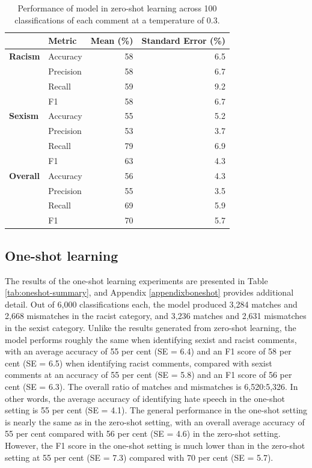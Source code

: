 \documentclass[12pt,]{article}
\begin{document}
\begin{table}

\caption{\label{tab:zeroshot-summary}Performance of model in zero-shot learning across 100 classifications of each comment at a temperature of 0.3.}
\centering
\begin{tabular}[t]{>{}llrr}
\toprule
 & Metric & Mean (\%) & Standard Error (\%)\\
\midrule
\textbf{Racism} & Accuracy & 58 & 6.5\\
\textbf{} & Precision & 58 & 6.7\\
\textbf{} & Recall & 59 & 9.2\\
\textbf{} & F1 & 58 & 6.7\\
\textbf{Sexism} & Accuracy & 55 & 5.2\\
\textbf{} & Precision & 53 & 3.7\\
\textbf{} & Recall & 79 & 6.9\\
\textbf{} & F1 & 63 & 4.3\\
\textbf{Overall} & Accuracy & 56 & 4.3\\
\textbf{} & Precision & 55 & 3.5\\
\textbf{} & Recall & 69 & 5.9\\
\textbf{} & F1 & 70 & 5.7\\
\bottomrule
\end{tabular}
\end{table}

\hypertarget{one-shot-learning-1}{%
\subsection{One-shot learning}\label{one-shot-learning-1}}

The results of the one-shot learning experiments are presented in Table \ref{tab:oneshot-summary}, and Appendix \ref{appendixboneshot} provides additional detail. Out of 6,000 classifications each, the model produced 3,284 matches and 2,668 mismatches in the racist category, and 3,236 matches and 2,631 mismatches in the sexist category. Unlike the results generated from zero-shot learning, the model performs roughly the same when identifying sexist and racist comments, with an average accuracy of 55 per cent (SE = 6.4) and an F1 score of 58 per cent (SE = 6.5) when identifying racist comments, compared with sexist comments at an accuracy of 55 per cent (SE = 5.8) and an F1 score of 56 per cent (SE = 6.3). The overall ratio of matches and mismatches is 6,520:5,326. In other words, the average accuracy of identifying hate speech in the one-shot setting is 55 per cent (SE = 4.1). The general performance in the one-shot setting is nearly the same as in the zero-shot setting, with an overall average accuracy of 55 per cent compared with 56 per cent (SE = 4.6) in the zero-shot setting. However, the F1 score in the one-shot setting is much lower than in the zero-shot setting at 55 per cent (SE = 7.3) compared with 70 per cent (SE = 5.7).
\end{document}

